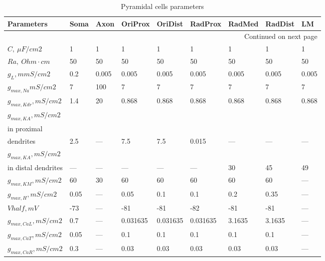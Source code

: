 \begin{longtable}{lllllllll}
\caption{Pyramidal cells parameters}
\label{tabel:ca1_pyramidal_cell_parameters}\\
\toprule
Parameters &     Soma &   Axon &   OriProx &   OriDist &   RadProx &  RadMed & RadDist &     LM \\
\midrule
\endhead
\midrule
\multicolumn{9}{r}{{Continued on next page}} \\
\midrule
\endfoot

\bottomrule
\endlastfoot
$C, \ \mu F/cm2$ &        1 &      1 &         1 &         1 &         1 &       1 &       1 &      1 \\
$Ra, \ Ohm \cdot cm$ &       50 &     50 &        50 &        50 &        50 &      50 &      50 &     50 \\
$g_L,mmS/cm2$ &      0.2 &  0.005 &     0.005 &     0.005 &     0.005 &   0.005 &   0.005 &  0.005 \\
$g_{max, Na} mS/cm2$ &        7 &    100 &         7 &         7 &         7 &       7 &       7 &      7 \\
$g_{max, Kdr}, mS/cm2$ &      1.4 &     20 &     0.868 &     0.868 &     0.868 &   0.868 &   0.868 &  0.868 \\
$ g_{max, KA}, mS/cm2$ \\ in proximal \\ dendrites&      2.5 &    --- &       7.5 &       7.5 &     0.015 &     --- &     --- &    --- \\
$g_{max, KA}, mS/cm2$ \\ in distal dendrites &      --- &    --- &       --- &       --- &       --- &      30 &      45 &     49 \\
$g_{max, KM}, mS/cm2 $ &       60 &     30 &        60 &        60 &        60 &      60 &      60 &    --- \\
$ g_{max, H}, mS/cm2 $ &     0.05 &    --- &      0.05 &       0.1 &       0.1 &     0.2 &    0.35 &    --- \\
$ Vhalf, mV$ &      -73 &    --- &       -81 &       -81 &       -82 &     -81 &     -81 &    --- \\
$g_{max, CaL}, mS/cm2 $ &      0.7 &    --- &  0.031635 &  0.031635 &  0.031635 &  3.1635 &  3.1635 &    --- \\
$g_{max, CaT}, mS/cm2 $ &     0.05 &    --- &       0.1 &       0.1 &       0.1 &     0.1 &     0.1 &    --- \\
$g_{max, CaR}, mS/cm2 $ &      0.3 &    --- &      0.03 &      0.03 &      0.03 &    0.03 &    0.03 &    --- \\

\end{longtable}
